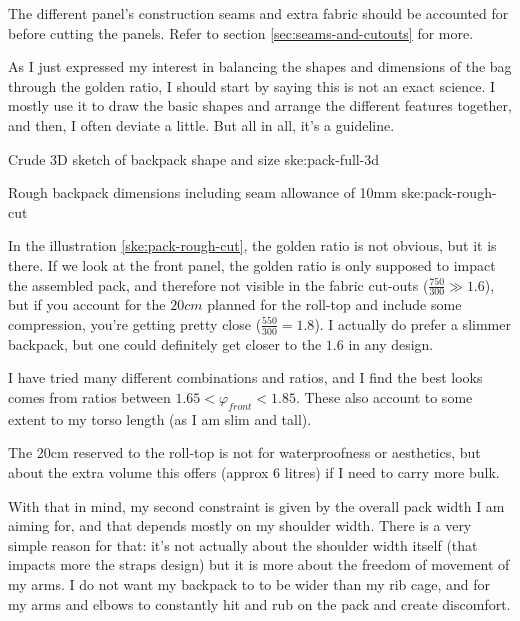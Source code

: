 \begin{warning}
  The different panel's construction seams and extra fabric should be accounted for before cutting the panels. Refer to section \ref{sec:seams-and-cutouts} for more.
\end{warning}

As I just expressed my interest in balancing the shapes and dimensions of the bag through the golden ratio, I should start by saying this is not an exact science. I mostly use it to draw the basic shapes and arrange the different features together, and then, I often deviate a little. But all in all, it's a guideline.

{Crude 3D sketch of backpack shape and size}
{ske:pack-full-3d}

{Rough backpack dimensions including seam allowance of 10mm}
{ske:pack-rough-cut}

In the illustration \ref{ske:pack-rough-cut}, the golden ratio is not obvious, but it is there. If we look at the front panel, the golden ratio is only supposed to impact the assembled pack, and therefore not visible in the fabric cut-outs ($\frac{750}{300} \gg 1.6$), but if you account for the $20cm$ planned for the roll-top and include some compression, you're getting pretty close ($\frac{550}{300} = 1.8$). I actually do prefer a slimmer backpack, but one could definitely get closer to the $1.6$ in any design.

I have tried many different combinations and ratios, and I find the best looks comes from ratios between $1.65 < \varphi_{front} < 1.85$. These also account to some extent to my torso length (as I am slim and tall).

\begin{note}
  The 20cm reserved to the roll-top is not for waterproofness or aesthetics, but about the extra volume this offers (approx 6 litres) if I need to carry more bulk.
\end{note}

With that in mind, my second constraint is given by the overall pack width I am aiming for, and that depends mostly on my shoulder width. There is a very simple reason for that: it's not actually about the shoulder width itself (that impacts more the straps design) but it is more about the freedom of movement of my arms. I do not want my backpack to to be wider than my rib cage, and for my arms and elbows to constantly hit and rub on the pack and create discomfort.
